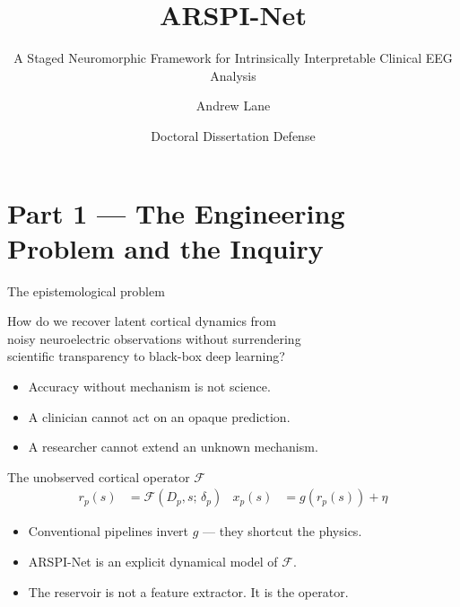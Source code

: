\documentclass[11pt,aspectratio=169]{beamer}
\title{ARSPI-Net}
\subtitle{A Staged Neuromorphic Framework for Intrinsically Interpretable Clinical EEG Analysis}
\author{Andrew Lane}
\institute{Department of Electrical \& Computer Engineering \\ Stony Brook University}
\date{Doctoral Dissertation Defense \quad\textbar\quad 2026}
\begin{document}
\maketitle

\section{Part 1 --- The Engineering Problem and the Inquiry}

\begin{frame}{The epistemological problem}
  \vspace{0.6em}
  \begin{center}
    \large How do we recover latent cortical dynamics from\\
    noisy neuroelectric observations \alert{without surrendering}\\
    scientific transparency to black-box deep learning?
  \end{center}
  \vspace{1.2em}
  \begin{itemize}
    \item Accuracy without mechanism is not science.
    \item A clinician cannot act on an opaque prediction.
    \item A researcher cannot extend an unknown mechanism.
  \end{itemize}
\end{frame}

\begin{frame}{The unobserved cortical operator $\mathcal{F}$}
  \vspace{0.8em}
  \begin{align*}
    r_p(s) &= \mathcal{F}(D_p, s;\, \delta_p) &
    x_p(s) &= g(r_p(s)) + \eta
  \end{align*}
  \vspace{0.4em}
  \begin{itemize}
    \item Conventional pipelines invert $g$ --- they shortcut the physics.
    \item ARSPI-Net is an explicit dynamical model of $\mathcal{F}$.
    \item The reservoir is not a feature extractor. It is the operator.
  \end{itemize}
\end{frame}
\end{document}
